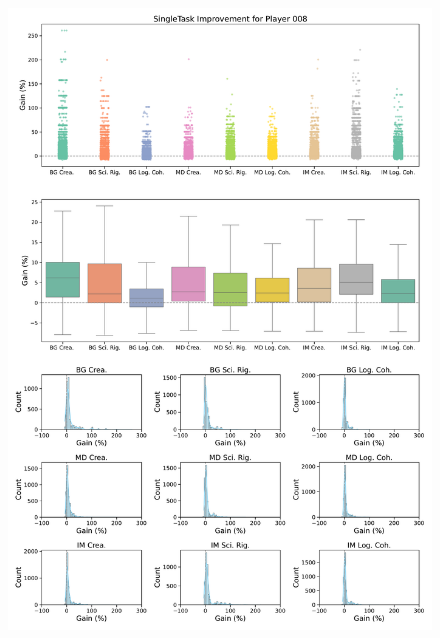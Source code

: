 \begin{figure}[ht]
  \centering
  \includegraphics[width=\textwidth]{figures/gain_validity/singletask/singletask_gain_player_00008.pdf}
\end{figure}
\clearpage


